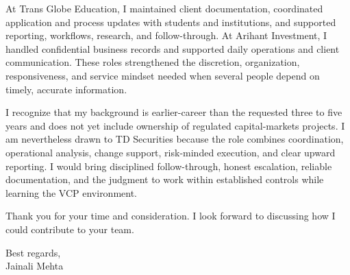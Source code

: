 \documentclass[letterpaper,11pt]{article}
\begin{document}
\bigbreak
At Trans Globe Education, I maintained client documentation, coordinated application and process updates with students and institutions, and supported reporting, workflows, research, and follow-through. At Arihant Investment, I handled confidential business records and supported daily operations and client communication. These roles strengthened the discretion, organization, responsiveness, and service mindset needed when several people depend on timely, accurate information.

\bigbreak
I recognize that my background is earlier-career than the requested three to five years and does not yet include ownership of regulated capital-markets projects. I am nevertheless drawn to TD Securities because the role combines coordination, operational analysis, change support, risk-minded execution, and clear upward reporting. I would bring disciplined follow-through, honest escalation, reliable documentation, and the judgment to work within established controls while learning the VCP environment.

\bigbreak
Thank you for your time and consideration. I look forward to discussing how I could contribute to your team.

\bigbreak
Best regards,\\
Jainali Mehta
\end{document}
